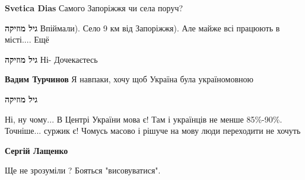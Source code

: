 \begin{itemize}
\begin{itemize}
 
\textbf{Svetica Dias}
Самого Запоріжжя чи села поруч?

 
\textbf{גיל מוזיקה} Впіймали).
Село 9 км від Запоріжжя).
Але майже всі працюють в місті.... Ещё

 
\textbf{גיל מוזיקה} Ні- Дочекаєтесь

 
\textbf{Вадим Турчинов}
Я навпаки, хочу щоб Україна була україномовною

 
\textbf{גיל מוזיקה} 

Ні, ну чому... В Центрі України мова є! Там і українців не менше 85\%-90\%.
Точніше... суржик є! Чомусь масово і рішуче на мову люди переходити не хочуть


 
\textbf{Сергій Лащенко}

Ще не зрозуміли ? Бояться "висовуватися".


\end{itemize}
\end{itemize}
